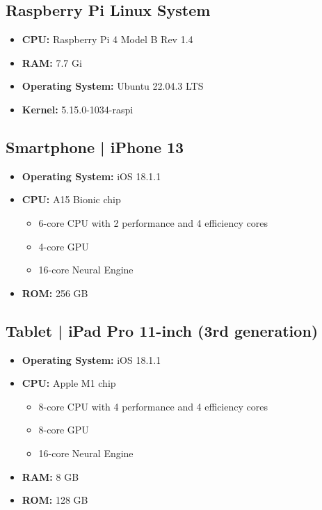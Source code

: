 \subsection{Raspberry Pi Linux System}
\label{app:system:pi}
\begin{itemize}
    \item \textbf{CPU:} Raspberry Pi 4 Model B Rev 1.4
    \item \textbf{RAM:} 7.7 Gi
    \item \textbf{Operating System:} Ubuntu 22.04.3 LTS
    \item \textbf{Kernel:} 5.15.0-1034-raspi
\end{itemize}

\subsection{Smartphone | iPhone 13}
\label{app:system:phone}
\begin{itemize}
    \item \textbf{Operating System:} iOS 18.1.1
    \item \textbf{CPU:} A15 Bionic chip
    \begin{itemize}
        \item 6-core CPU with 2 performance and 4 efficiency cores \cite{appendix:smartphone}
        \item 4-core GPU \cite{appendix:smartphone}
        \item 16-core Neural Engine \cite{appendix:smartphone}
    \end{itemize}
    \item \textbf{ROM:} 256 GB
\end{itemize}

\subsection{Tablet | iPad Pro 11-inch (3rd generation)}
\label{app:system:tablet}
\begin{itemize}
    \item \textbf{Operating System:} iOS 18.1.1
    \item \textbf{CPU:} Apple M1 chip
    \begin{itemize}
        \item 8-core CPU with 4 performance and 4 efficiency cores \cite{appendix:tablet}
        \item 8-core GPU \cite{appendix:tablet}
        \item 16-core Neural Engine \cite{appendix:tablet}
    \end{itemize}
    \item \textbf{RAM:} 8 GB \cite{appendix:tablet}
    \item \textbf{ROM:} 128 GB
\end{itemize}

